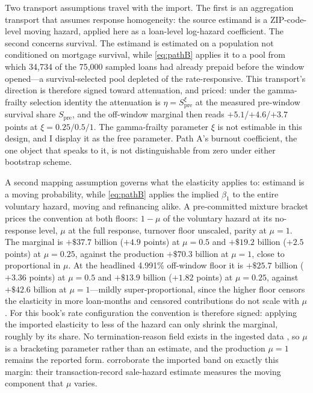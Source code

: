 Two transport assumptions travel with the import. The first is an aggregation transport that assumes response homogeneity: the source estimand is a ZIP-code-level moving hazard, applied here as a loan-level log-hazard coefficient. The second concerns survival. The estimand is estimated on a population not conditioned on mortgage survival, while \eqref{eq:pathB} applies it to a pool from which 34,734 of the 75,000 sampled loans had already prepaid before the window opened---a survival-selected pool depleted of the rate-responsive. This transport's direction is therefore signed toward attenuation, and priced: under the gamma-frailty selection identity the attenuation is $\eta = S_{\mathrm{pre}}^{\xi}$ at the measured pre-window survival share $S_{\mathrm{pre}}$, and the off-window marginal then reads $+5.1$/$+4.6$/$+3.7$ points at $\xi = 0.25/0.5/1$. The gamma-frailty parameter $\xi$ is not estimable in this design, and I display it as the free parameter. Path A's burnout coefficient, the one object that speaks to it, is not distinguishable from zero under either bootstrap scheme.

A second mapping assumption governs what the elasticity applies to:  estimand is a moving probability, while \eqref{eq:pathB} applies the implied $\beta_1$ to the entire voluntary hazard, moving and refinancing alike. A pre-committed mixture bracket prices the convention at both floors: $1-\mu$ of the voluntary hazard at its no-response level, $\mu$ at the full response, turnover floor unscaled, parity at $\mu = 1$. The marginal is $+\$37.7$ billion ($+4.9$ points) at $\mu = 0.5$ and $+\$19.2$ billion ($+2.5$ points) at $\mu = 0.25$, against the production $+\$70.3$ billion at $\mu = 1$, close to proportional in $\mu$. At the headlined 4.991\% off-window floor it is $+\$25.7$ billion ($+3.36$ points) at $\mu = 0.5$ and $+\$13.9$ billion ($+1.82$ points) at $\mu = 0.25$, against $+\$42.6$ billion at $\mu = 1$---mildly super-proportional, since the higher floor censors the elasticity in more loan-months and censored contributions do not scale with $\mu$. For this book's rate configuration the convention is therefore signed: applying the imported elasticity to less of the hazard can only shrink the marginal, roughly by its share. No termination-reason field exists in the ingested data \citep[cf.][on the refinancing-versus-moving mix]{amromin2020}, so $\mu$ is a bracketing parameter rather than an estimate, and the production $\mu = 1$ remains the reported form. \citet{graybill2026} corroborate the imported band on exactly this margin: their transaction-record sale-hazard estimate measures the moving component that $\mu$ varies.


